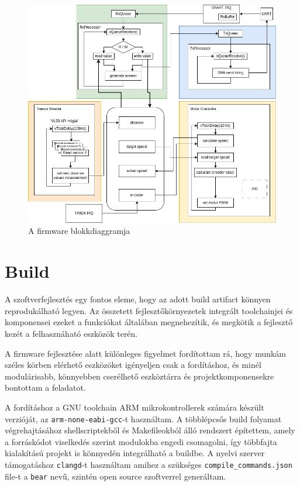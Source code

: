 \begin{figure}
  \centering \includegraphics[width=150mm,
    keepaspectratio]{figures/ch3/firmware-architecture.png}
  \caption{A firmware blokkdiaggramja}
  \label{fig:firmware_arch}
\end{figure}

\section{Build}

A szoftverfejlesztés egy fontos eleme, hogy az adott build artifact könnyen
reprodukálható legyen. Az összetett fejlesztőkörnyezetek integrált toolchainjei
és komponensei ezeket a funkciókat általában megnehezítik, és megkötik a
fejlesztő kezét a felhasznáható eszközök terén.

A firmware fejlesztése alatt különleges figyelmet fordítottam rá, hogy munkám
széles körben elérhető eszközöket igényeljen csak a fordításhoz, és minél
modulárisabb, könnyebben cserélhető eszköztárra és projektkomponensekre bontottam
a feladatot.

A fordításhoz a GNU toolchain ARM mikrokontrollerek számára készült verzióját, az
\verb|arm-none-eabi-gcc|-t használtam. A többlépcsős build folyamat
végrehajtásához shellscriptekből és Makefileokból álló rendszert építettem, amely
a forráskódot viselkedés szerint modulokba engedi csomagolni, így többfajta
kialakítású projekt is könnyedén integrálható a buildbe. A nyelvi szerver
támogatáshoz \verb|clangd|-t használtam amihez a szükséges
\verb|compile_commands.json| file-t a \verb|bear| nevű, szintén open source
szoftverrel generáltam.

